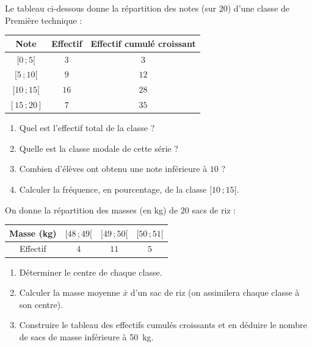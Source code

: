 \documentclass[11pt]{article}
\begin{document}
\begin{exercice}
Le tableau ci-dessous donne la répartition des notes (sur $20$) d'une classe de Première technique :
\begin{center}
\begin{tabular}{|c|c|c|}
\hline
Note & Effectif & Effectif cumulé croissant \\
\hline
$[0\,;5[$ & $3$ & $3$ \\
\hline
$[5\,;10[$ & $9$ & $12$ \\
\hline
$[10\,;15[$ & $16$ & $28$ \\
\hline
$[15\,;20]$ & $7$ & $35$ \\
\hline
\end{tabular}
\end{center}
\begin{enumerate}
\item Quel est l'effectif total de la classe ?
\item Quelle est la classe modale de cette série ?
\item Combien d'élèves ont obtenu une note inférieure à $10$ ?
\item Calculer la fréquence, en pourcentage, de la classe $[10\,;15[$.
\end{enumerate}
\end{exercice}

\begin{exercice}
On donne la répartition des masses (en \si{\kilo\gram}) de $20$ sacs de riz :
\begin{center}
\begin{tabular}{|c|c|c|c|}
\hline
Masse (kg) & $[48\,;49[$ & $[49\,;50[$ & $[50\,;51[$ \\
\hline
Effectif & $4$ & $11$ & $5$ \\
\hline
\end{tabular}
\end{center}
\begin{enumerate}
\item Déterminer le centre de chaque classe.
\item Calculer la masse moyenne $\bar{x}$ d'un sac de riz (on assimilera chaque classe à son centre).
\item Construire le tableau des effectifs cumulés croissants et en déduire le nombre de sacs de masse inférieure à \SI{50}{\kilo\gram}.
\end{enumerate}
\end{exercice}
\end{document}
